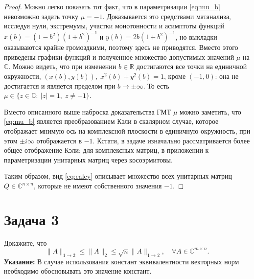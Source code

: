 \documentclass{article}
\newtheorem*{proof}{$\square$}
\newcommand{\R}{\mathbb{R}}
\renewcommand{\C}{\mathbb{C}}
\renewcommand{\leq}{\leqslant}
\begin{document}
\begin{proof}
		Можно легко показать тот факт, что в параметризации \eqref{eq:mu_b} невозможно задать точку $\mu=-1$. Доказывается это средствами матанализа, исследуя нули, экстремумы, участки монотонности и асимптоты функций $x(b)=(1-b^2)(1+b^2)^{-1}$ и $y(b)=2b (1+b^2)^{-1}$, но выкладки оказываются крайне громоздкими, поэтому здесь не приводятся. Вместо этого приведены графики функций и полученное множество допустимых значений $\mu$ на $\C$. Можно видеть, что при изменении $b\in\R$ достигаются все точки на единичной окружности, $(x(b), y(b)),\; x^2(b)+y^2(b)=1$, кроме $(-1, 0)$: она не достигается и является пределом при $b\rightarrow \pm \infty$. То есть $\mu \in \{z\in\C:\: |z|=1,\; z\neq -1\}$.
		
		Вместо описанного выше наброска доказательства ГМТ $\mu$ можно заметить, что \eqref{eq:mu_b} является преобразованием Кэли в скалярном случае, которое отображает мнимую ось на комплексной плоскости в единичную окружность, при этом $\pm i \infty$ отображается в $-1$. Кстати, в задаче изначально рассматривается более общее отображение Кэли: для комплексных матриц, в приложении к параметризации унитарных матриц через косоэрмитовы. 
		
		Таким образом, вид \eqref{eq:caley} описывает множество всех унитарных матриц $Q\in\C^{n\times n}$, которые не имеют собственного значения $-1$.
		\end{proof}
		
		\section*{Задача 3}
		Докажите, что
		\[
		\|A\|_{1\to 2} \leq  \|A\|_{2} \leq \sqrt{n} \|A\|_{1\to 2
		}, \quad \forall A\in\mathbb{C}^{m\times n}.
		\] 
		\textbf{Указание:} В случае использования констант эквивалентности векторных норм необходимо обосновывать это значение констант. 
		
\end{document}
